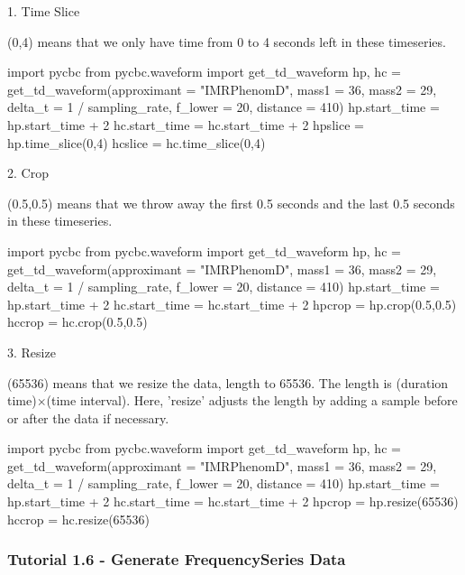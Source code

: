 1. Time Slice

(0,4) means that we only have time from 0 to 4 seconds left in these timeseries.

\begin{python}[python3]
    import pycbc
    from pycbc.waveform import get_td_waveform
    hp, hc = get_td_waveform(approximant = "IMRPhenomD",
                             mass1 = 36,
                             mass2 = 29,
                             delta_t = 1 / sampling_rate,
                             f_lower = 20,
                             distance = 410)
    hp.start_time = hp.start_time + 2
    hc.start_time = hc.start_time + 2
    hpslice = hp.time_slice(0,4)
    hcslice = hc.time_slice(0,4)
\end{python}

2. Crop

(0.5,0.5) means that we throw away the first 0.5 seconds and the last 0.5 seconds in these timeseries.

\begin{python}[python3]
    import pycbc
    from pycbc.waveform import get_td_waveform
    hp, hc = get_td_waveform(approximant = "IMRPhenomD",
                             mass1 = 36,
                             mass2 = 29,
                             delta_t = 1 / sampling_rate,
                             f_lower = 20,
                             distance = 410)
    hp.start_time = hp.start_time + 2
    hc.start_time = hc.start_time + 2
    hpcrop = hp.crop(0.5,0.5)
    hccrop = hc.crop(0.5,0.5)
\end{python}

3. Resize

(65536) means that we resize the data, length to 65536. The length is (duration time)$\times$(time interval). Here, 'resize' adjusts the length by adding a sample before or after the data if necessary.

\begin{python}[python3]
    import pycbc
    from pycbc.waveform import get_td_waveform
    hp, hc = get_td_waveform(approximant = "IMRPhenomD",
                             mass1 = 36,
                             mass2 = 29,
                             delta_t = 1 / sampling_rate,
                             f_lower = 20,
                             distance = 410)
    hp.start_time = hp.start_time + 2
    hc.start_time = hc.start_time + 2
    hpcrop = hp.resize(65536)
    hccrop = hc.resize(65536)
\end{python}

\subsubsection{Tutorial 1.6 - Generate FrequencySeries Data}

